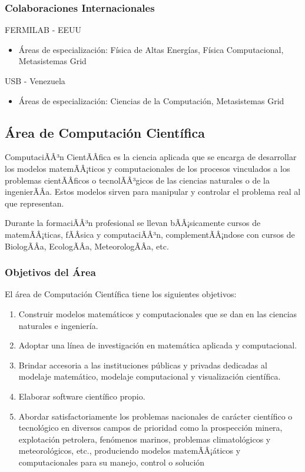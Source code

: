 \subsubsection{Colaboraciones Internacionales}

FERMILAB - EEUU
\begin{itemize}
\item  \'Areas de especializaci\'on: F\'isica de Altas Energ\'ias, F\'isica Computacional, Metasistemas Grid 
\end{itemize}

USB - Venezuela
\begin{itemize}
\item  \'Areas de especializaci\'on: Ciencias de la Computaci\'on, Metasistemas Grid 
\end{itemize}


\subsection{\'Area de Computaci\'on Cient\'ifica}

ComputaciÃÂ³n CientÃÂ­fica es la ciencia aplicada que se encarga de desarrollar los modelos matemÃÂ¡ticos y computacionales de los procesos vinculados a los problemas cientÃÂ­ficos o tecnolÃÂ³gicos de las ciencias naturales o de la ingenierÃÂ­a. Estos modelos sirven para manipular y controlar el problema real al que representan.

Durante la formaciÃÂ³n profesional se llevan bÃÂ¡sicamente cursos de matemÃÂ¡ticas, fÃÂ­sica y computaciÃÂ³n, complementÃÂ¡ndose con cursos de BiologÃÂ­a, EcologÃÂ­a, MeteorologÃÂ­a, etc.

\subsubsection{Objetivos del \'Area}

El \'area de Computaci\'on Cient\'ifica tiene los siguientes objetivos: 
\begin{enumerate}
\item Construir modelos matem\'aticos y computacionales que se dan en las ciencias naturales e ingenier\'ia.
\item Adoptar una l\'inea de investigaci\'on en matem\'atica aplicada y computacional.
\item Brindar accesoria a las instituciones p\'ublicas y privadas dedicadas al modelaje matem\'atico, modelaje computacional y visualizaci\'on cient\'ifica.
\item Elaborar software cient\'ifico propio.
\item Abordar satisfactoriamente los problemas nacionales de car\'acter cient\'ifico o tecnol\'ogico en diversos campos de prioridad como la prospecci\'on minera, explotaci\'on petrolera, fen\'omenos marinos, problemas climatol\'ogicos y meteorol\'ogicos, etc., produciendo modelos matemÃÂ¡\'aticos y computacionales para su manejo, control o soluci\'on
\end{enumerate}

